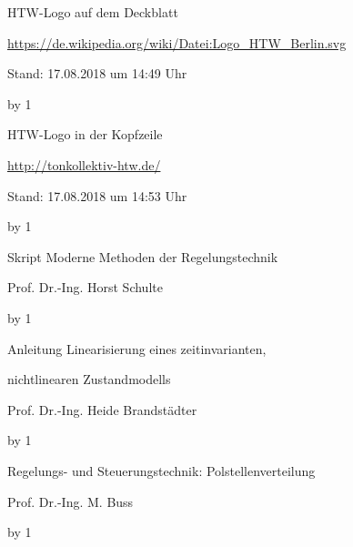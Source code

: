 \documentclass[
	pagesize,
	fontsize=12pt,
	paper=a4,
	oneside,
   reqno
]{scrartcl}
\begin{document}
\begin{thebibliography}{999}
{\setlength{\emergencystretch}{3cm}%

HTW-Logo auf dem Deckblatt\par
\url{https://de.wikipedia.org/wiki/Datei:Logo_HTW_Berlin.svg} \par
 Stand: 17.08.2018 um 14:49 Uhr

\advance\Quellennummer by 1
 
HTW-Logo in der Kopfzeile\par
\url{http://tonkollektiv-htw.de/} \par
 Stand: 17.08.2018 um 14:53 Uhr

\advance\Quellennummer by 1

Skript Moderne Methoden der Regelungstechnik\par
Prof.\xspace Dr.\xspace -Ing.\xspace Horst Schulte

\advance\Quellennummer by 1

Anleitung Linearisierung eines zeitinvarianten,\par
nichtlinearen Zustandmodells\par
Prof.\xspace Dr.\xspace -Ing.\xspace Heide Brandstädter

\advance\Quellennummer by 1

Regelungs- und Steuerungstechnik: Polstellenverteilung\par
Prof.\xspace Dr.\xspace -Ing.\xspace M. Buss

\advance\Quellennummer by 1

}
\end{thebibliography}
\end{document}
